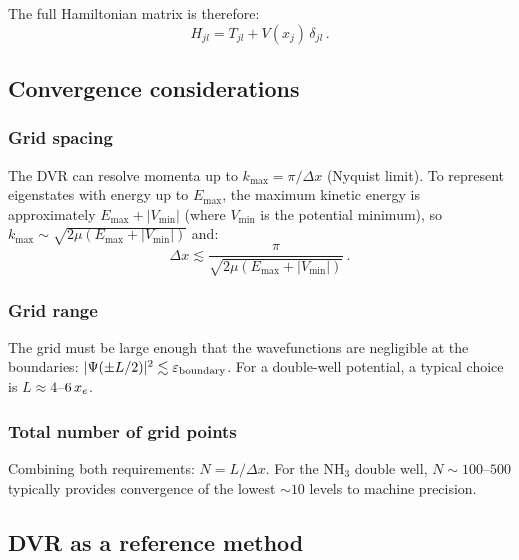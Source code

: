 The full Hamiltonian matrix is therefore:
\begin{equation}
  H_{jl} = T_{jl} + V(x_j)\,\delta_{jl}\,.
\end{equation}

\subsection{Convergence considerations}\label{sec:DVR_convergence}

\subsubsection{Grid spacing}

The DVR can resolve momenta up to $k_{\max} = \pi/\Delta x$ (Nyquist limit).
To represent eigenstates with energy up to $E_{\max}$, the maximum kinetic energy
is approximately $E_{\max} + |V_{\min}|$ (where $V_{\min}$ is the potential minimum),
so $k_{\max} \sim \sqrt{2\mu(E_{\max}+|V_{\min}|)}$ and:
\begin{equation}
  \Delta x \lesssim \frac{\pi}{\sqrt{2\mu(E_{\max}+|V_{\min}|)}}\,.
\end{equation}

\subsubsection{Grid range}

The grid must be large enough that the wavefunctions are negligible at the boundaries:
$|\Psi(\pm L/2)|^2 \lesssim \varepsilon_{\text{boundary}}$. For a double-well potential, a
typical choice is $L \approx 4$--$6\,x_e$.

\subsubsection{Total number of grid points}

Combining both requirements: $N = L/\Delta x$. For the NH$_3$ double well,
$N \sim 100$--$500$ typically provides convergence of the lowest $\sim 10$ levels
to machine precision.

\subsection{DVR as a reference method}\label{sec:DVR_benchmark}

